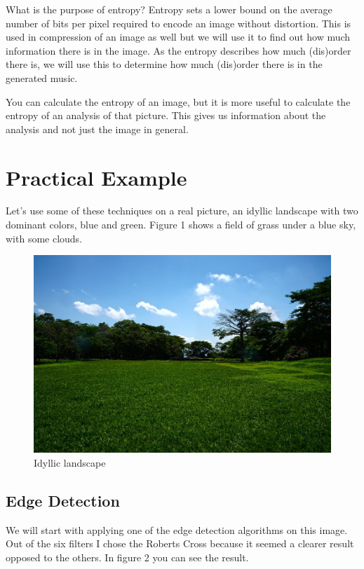 \documentclass[12pt]{article}
\begin{document}
What is the purpose of entropy? Entropy sets a lower bound on the average number of bits per pixel required to encode an image without distortion. This is used in compression of an image as well but we will use it to find out how much information there is in the image.
As the entropy describes how much (dis)order there is, we will use this to determine how much (dis)order there is in the generated music.
\newline

You can calculate the entropy of an image, but it is more useful to calculate the entropy of an analysis of that picture. This gives us information about the analysis and not just the image in general.

\section{Practical Example}

Let's use some of these techniques on a real picture, an idyllic landscape with two dominant colors, blue and green. Figure 1 shows a field of grass under a blue sky, with some clouds.

\begin{figure}[h]
\centering
\includegraphics[scale = 0.38]{img/landscape}
\caption{Idyllic landscape}
\end{figure}

\subsection{Edge Detection}

We will start with applying one of the edge detection algorithms on this image. Out of the six filters I chose the Roberts Cross because it seemed a clearer result opposed to the others. In figure 2 you can see the result.
\end{document}
